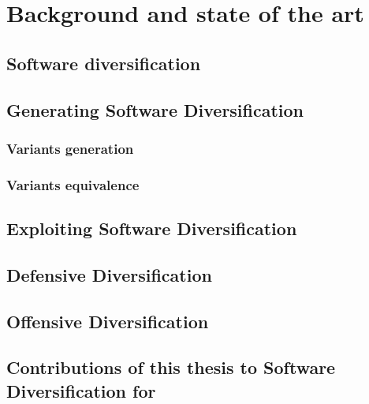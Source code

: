 \chapter{Background and state of the art}
\label{SOTA}


\section{\Wasm}

\section{Software diversification}

\section{Generating Software Diversification}

\subsection{Variants generation}

\subsection{Variants equivalence}

\section{Exploiting Software Diversification}

\section{Defensive Diversification}

\section{Offensive Diversification}

\section{Contributions of this thesis to Software Diversification for \Wasm}